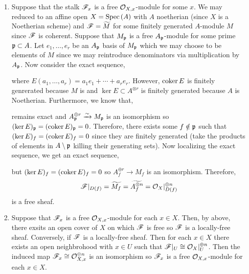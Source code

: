 \documentclass[12pt]{article}
\begin{document}
\begin{enumerate}
\item Suppose that the stalk $\mathscr{F}_x$ is a free $\mathcal{O}_{X, x}$-module for some $x$. We may reduced to an affine open $X = \mathrm{Spec}\left( A \right)$ with $A$ noetherian (since $X$ is a Noetherian scheme) and $\mathscr{F} = \widetilde{M}$ for some finitely generated $A$-module $M$ since $\mathscr{F}$ is coherent. Suppose that $M_{\mathfrak{p}}$ is a free $A_{\mathfrak{p}}$-module for some prime $\mathfrak{p} \subset A$. Let $e_1, \dots, e_r$ be an $A_{\mathfrak{p}}$ basis of $M_{\mathfrak{p}}$ which we may choose to be elements of $M$ since we may reintroduce denominators via multiplication by $A_{\mathfrak{p}}$. Now consider the exact sequence,
\begin{center}
\end{center}
where $E(a_1, \dots, a_r) = a_1 e_1 + \cdots + a_r e_r$. However, $\operatorname{\mathrm{coker}}{E}$ is finitely genrerated because $M$ is and $\ker{E} \subset A^{\otimes r}$ is finitely generated because $A$ is Noetherian. Furthermore, we know that,
\begin{center}
\end{center}
remains exact and $A_{\mathfrak{p}}^{\oplus r} \xrightarrow{\sim} M_{\mathfrak{p}}$ is an isomorphism so $(\ker{E})_{\mathfrak{p}} = (\operatorname{\mathrm{coker}}{E})_{\mathfrak{p}} = 0$. Therefore, there exists some $f \notin \mathfrak{p}$ such that $(\ker{E})_f = (\operatorname{\mathrm{coker}}{E})_f = 0$ since they are finitely generated (take the products of elements in $A \setminus \mathfrak{p}$ killing their generating sets). Now localizing the exact sequence, we get an exact sequence,
\begin{center}
\end{center}
but $(\ker{E})_f = (\operatorname{\mathrm{coker}}{E})_f = 0$ so $A_f^{\oplus r} \to M_f$ is an isomorphism. Therefore, 
\[ \mathscr{F}|_{D(f)} = \widetilde{M_f} = \widetilde{A_f^{\oplus n}} = \mathcal{O}_{X}|_{D(f)}^{\oplus n} \] 
is a free sheaf. 

\item Suppose that $\mathscr{F}_x$ is a free $\mathcal{O}_{X, x}$-module for each $x \in X$. Then, by above, there exsits an open cover of $X$ on which $\mathscr{F}$ is free so $\mathscr{F}$ is a locally-free sheaf. Conversely, if $\mathscr{F}$ is a locally-free sheaf. Then for each $x \in X$ there exists an open neighbrohood with $x \in U$ such that $\mathscr{F}|_U \cong \mathcal{O}_{X} |_U^{\oplus n}$. Then the induced map $\mathscr{F}_x \cong \mathcal{O}_{X, x}^{\oplus n}$ is an isomorphism so $\mathscr{F}_x$ is a free $\mathcal{O}_{X, x}$-module for each $x \in X$. 


\end{enumerate}
\end{document}

